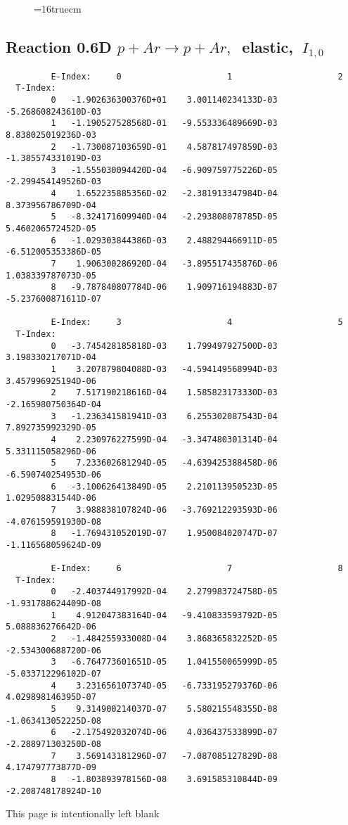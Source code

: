 \documentclass[12pt]{article}
\begin{document}
\begin{figure} \label{0.6T}
\epsfxsize=16truecm
\end{figure}
\newpage

\subsection{
Reaction 0.6D  $p + Ar \rightarrow p + Ar ,\ $
 elastic, $\  I_{1,0}$
}

\begin{small}\begin{verbatim}
         E-Index:     0                     1                     2
  T-Index:
         0   -1.902636300376D+01    3.001140234133D-03   -5.268608243610D-03
         1   -1.190527528568D-01   -9.553336489669D-03    8.838025019236D-03
         2   -1.730087103659D-01    4.587817497859D-03   -1.385574331019D-03
         3   -1.555030094420D-04   -6.909759775226D-05   -2.299454149526D-03
         4    1.652235885356D-02   -2.381913347984D-04    8.373956786709D-04
         5   -8.324171609940D-04   -2.293808078785D-05    5.460206572452D-05
         6   -1.029303844386D-03    2.488294466911D-05   -6.512005353386D-05
         7    1.906300286920D-04   -3.895517435876D-06    1.038339787073D-05
         8   -9.787840807784D-06    1.909716194883D-07   -5.237600871611D-07
 
         E-Index:     3                     4                     5
  T-Index:
         0   -3.745428185818D-03    1.799497927500D-03    3.198330217071D-04
         1    3.207879804088D-03   -4.594149568994D-03    3.457996925194D-06
         2    7.517190218616D-04    1.585823173330D-03   -2.165980750364D-04
         3   -1.236341581941D-03    6.255302087543D-04    7.892735992329D-05
         4    2.230976227599D-04   -3.347480301314D-04    5.331115058296D-06
         5    7.233602681294D-05   -4.639425388458D-06   -6.590740254953D-06
         6   -3.100626413849D-05    2.210113950523D-05    1.029508831544D-06
         7    3.988838107824D-06   -3.769212293593D-06   -4.076159591930D-08
         8   -1.769431052019D-07    1.950084020747D-07   -1.116568059624D-09
 
         E-Index:     6                     7                     8
  T-Index:
         0   -2.403744917992D-04    2.279983724758D-05   -1.931788624409D-08
         1    4.912047383164D-04   -9.410833593792D-05    5.088836276642D-06
         2   -1.484255933008D-04    3.868365832252D-05   -2.534300688720D-06
         3   -6.764773601651D-05    1.041550065999D-05   -5.033712296102D-07
         4    3.231656107374D-05   -6.733195279376D-06    4.029898146395D-07
         5    9.314900214037D-07    5.580215548355D-08   -1.063413052225D-08
         6   -2.175492032074D-06    4.036437533899D-07   -2.288971303250D-08
         7    3.569143181296D-07   -7.087085127829D-08    4.174797773877D-09
         8   -1.803893978156D-08    3.691585310844D-09   -2.208748178924D-10

\end{verbatim}\end{small}
\newpage
This page is intentionally left blank
\newpage
\end{document}

